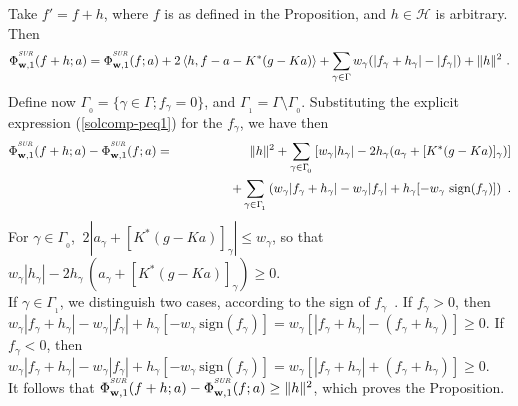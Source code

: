 \documentclass[10pt]{article}
\newcommand{\QED}{\hfill \raisebox{-2pt}{\rule{5.6pt}{8pt}\rule{4pt}{0pt}}%
  \smallskip\par}
\def\cH{\mathcal{H}}
\def\K{K^*}
\def\SUR{\mbox{\tiny{\it{SUR}}}}
\def\fg{f_{\gamma}}
\def\ag{w_{\gamma}}
\def\g{\gamma}
\newcommand\eref[1]{(\ref{#1})}
\begin{document}
Take $f'=f+h$, where $f$ is as defined in the Proposition, and $
h \in \cH$
is arbitrary. Then
$$
{\Phi}^{^{\SUR}}_{\mathbf{w},1}(f+h ; a) =
{\Phi}^{^{\SUR}}_{\mathbf{w},1}(f ; a)+ 2 \left<h,f-a -\K (g
-Ka) \right>
+\sum_{\g \in \Gamma} \ag (|\fg +h_{\g}| -|\fg|) + \|h\|^2  ~.
$$
Define now $\Gamma_{_{\!0}}=\{\g \in \Gamma; \fg=0\}$, and
$\Gamma_{_{\!1}}=\Gamma \setminus
\Gamma_{_{\!0}}$.
Substituting the explicit expression \eref{solcomp-peq1} for the $\fg$, we
have then
\begin{eqnarray*}
{\Phi}^{^{\SUR}}_{\mathbf{w},1}(f+h ; a)-
{\Phi}^{^{\SUR}}_{\mathbf{w},1}(f; a) &= &\|h\|^2
+ \sum_{\g \in \Gamma_{_{\!0}}}
\left[ \ag |h_{\g}| - 2 h_{\g} (a_{\g} +[ \K (g -K a)]_{\g} ) \right] \\
&&~~~~~~~~~~~~
+\sum_{\g \in \Gamma_{_{\!1}}} \left( \ag |\fg + h_{\g}| - \ag |\fg| + h_{\g}
[-\ag  ~ \mbox{sign}(\fg) ]\right) ~.
\end{eqnarray*}
For $\g \in \Gamma_{_{\!0}}$, $~2|a_{\g} +[ \K (g -K a)]_{\g}| \leq
\ag$, so
that
$\ag |h_{\g}| - 2 h_{\g}\, (a_{\g} +[ \K (g -K a)]_{\g}) \geq  0$.\\
If $\g \in \Gamma_{_{\!1}}$, we distinguish two cases, according to the sign
of $\fg$\, . If $\fg >0$, then\\
$\ag |\fg + h_{\g}| - \ag |\fg| + h_{\g}
[-\ag  ~ \mbox{sign}(\fg) ]= \ag [ |\fg +h_{\g}| - (\fg + h_{\g}) ] \geq 0$.
If $\fg <0$, then $\ag |\fg + h_{\g}| - \ag |\fg| + h_{\g}
[-\ag  ~ \mbox{sign}(\fg) ]= \ag [ |\fg +h_{\g}| + (\fg + h_{\g}) ] \geq 0$.\\
It follows that ${\Phi}^{^{\SUR}}_{\mathbf{w},1}(f+h;a)-
{\Phi}^{^{\SUR}}_{\mathbf{w},1}(f;a) \geq \|h\|^2 $, which
proves the Proposition.
 \hfill \QED

\bigskip
\end{document}
